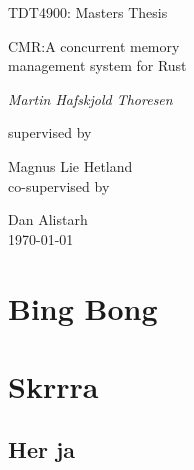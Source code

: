 \documentclass[b5paper, twoside]{report}
\theoremstyle{plain}
\theoremstyle{definition}
\begin{document}
\renewcommand{\thepage}{\roman{page}}%

\begin{titlepage}
  \centering
  \vspace{1.5cm}
  {\Large TDT4900: Masters Thesis \par}
  \vspace{1cm}
  {\huge CMR:\@ A concurrent memory\\ management system for Rust\par}
  \vspace{2cm}
  {\Large\itshape{}Martin Hafskjold Thoresen\par}
  \vfill
  supervised by\par
  {\large Magnus Lie Hetland}\\
  \vspace{0.4cm}
  co-supervised by\par
  {\large Dan Alistarh}\\
  \vfill
  {\large \today\\}
\end{titlepage}








\tableofcontents%
\listoffigures%

\clearpage\null
\clearpage\setcounter{page}{1}%
\renewcommand{\thepage}{\arabic{page}}%
\part{Bing Bong}

\pagestyle{fancy}










\part{Skrrra}











\begin{appendices}
  \chapter{Her ja}
\end{appendices}

\printglossary[type=\acronymtype,title=Abbreviations]
\printglossary{}



\end{document}

